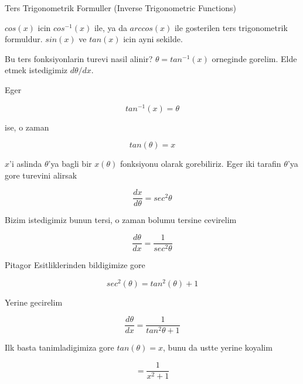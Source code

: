 \documentclass[12pt,fleqn]{article}\usepackage{../common}
\begin{document}
Ters Trigonometrik Formuller (Inverse Trigonometric Functions)

$cos(x)$ icin $cos^{-1}(x)$ ile, ya da $arccos(x)$ ile gosterilen ters
trigonometrik formuldur. $sin(x)$ ve $tan(x)$ icin ayni sekilde. 

Bu ters fonksiyonlarin turevi nasil alinir? $\theta = tan^{-1}(x)$ orneginde
gorelim. Elde etmek istedigimiz $d\theta/dx$. 

Eger

\[ tan^{-1}(x) = \theta\]

ise, o zaman 

\[ tan(\theta) = x \]

$x$'i aslinda $\theta$'ya bagli bir $x(\theta)$ fonksiyonu olarak gorebiliriz. 
Eger iki tarafin $\theta$'ya gore turevini alirsak

\[ \frac{dx}{d\theta} = sec^{2}\theta \]

Bizim istedigimiz bunun tersi, o zaman bolumu tersine cevirelim

\[ \frac{d\theta}{dx} = \frac{1}{sec^{2}\theta} \]

Pitagor Esitliklerinden bildigimize gore

\[ sec^{2}(\theta) = tan^{2}(\theta) + 1 \]

Yerine gecirelim

\[ \frac{d\theta}{dx} = \frac{1}{tan^{2}\theta + 1} \]

Ilk basta tanimladigimiza gore $tan(\theta) = x$, bunu da ustte yerine
koyalim

\[  = \frac{1}{x^2 + 1} \]
\end{document}
